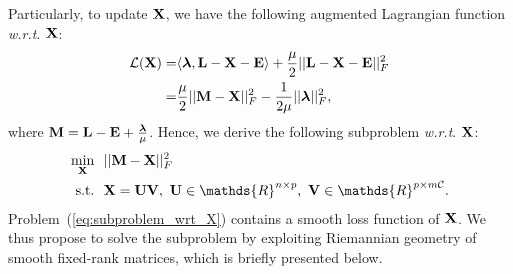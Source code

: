 \documentclass[10pt,twocolumn,letterpaper]{article}
\def\bM{{\bf M}}
\def\bE{{\bf E}}
\def\blambda{{\bm \lambda}}
\def\calL{{\mathcal{L}}}
\def\calC{{\mathcal{C}}}
\def\bL{{\bf L}}
\def\bU{{\bf U}}
\def\bV{{\bf V}}
\def\dsR{\mathds{R}}
\def\bX{{\bf X}}
\def\bX{{\bf X}}
\def\st{{\text{s.t.}}}
\def\wrt{\emph{w.r.t}}
\begin{document}
Particularly, to update $\bX$, we have the following augmented Lagrangian function \wrt. $\bX$:
{\small
\begin{align}\label{eq:langrangian_wrt_X}
  \calL (\bX) = & \langle \blambda, \bL - \bX - \bE \rangle + \frac{\mu}{2} || \bL - \bX - \bE ||_F^2  \nonumber  \\
              = & \frac{\mu}{2} || \bM - \bX ||_F^2 - \frac{1}{2\mu}|| \blambda ||_F^2   ,
\end{align}
}
\noindent
where $\bM = \bL - \bE + \frac{\blambda}{\mu}$.
Hence, we derive the following subproblem \wrt. $\bX$:
{\small
\begin{align}\label{eq:subproblem_wrt_X}
  \min_{\bX} ~&~ || \bM - \bX ||_F^2    \nonumber \\
  \st        ~&~ \bX = \bU \bV,~\bU \in \dsR^{n \times p},~\bV \in \dsR^{p \times m\calC}   .
\end{align}
}
\noindent
Problem~(\ref{eq:subproblem_wrt_X}) contains a smooth loss function of $\bX$.
We thus propose to solve the subproblem by exploiting Riemannian geometry of smooth fixed-rank matrices, which is briefly presented below.
\end{document}
